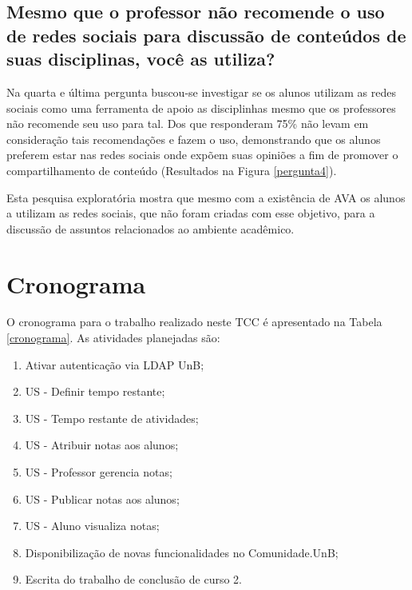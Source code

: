 \subsection*{Mesmo que o professor não recomende o uso de redes sociais para discussão de conteúdos de suas disciplinas, você as utiliza?}

Na quarta e última pergunta buscou-se investigar se os alunos utilizam as redes sociais como uma ferramenta de apoio as disciplinhas mesmo que os professores não recomende seu uso para tal. Dos que responderam 75\% não levam em consideração tais recomendações e fazem o uso, demonstrando que os alunos preferem estar nas redes sociais onde expõem suas opiniões a fim de promover o compartilhamento de conteúdo (Resultados na Figura \ref{pergunta4}).

Esta pesquisa exploratória mostra que mesmo com a existência de AVA os alunos a utilizam as redes sociais, que não foram criadas com esse objetivo, para a discussão de assuntos relacionados ao ambiente acadêmico.

\section{Cronograma}

O cronograma para o trabalho realizado neste TCC é apresentado na Tabela \ref{cronograma}. As atividades planejadas são:

\begin{enumerate}
\item Ativar autenticação via LDAP UnB;
\item US - Definir tempo restante;
\item US - Tempo restante de atividades;
\item US - Atribuir notas aos alunos;
\item US - Professor gerencia notas;
\item US - Publicar notas aos alunos;
\item US - Aluno visualiza notas;
\item Disponibilização de novas funcionalidades no Comunidade.UnB;
\item Escrita do trabalho de conclusão de curso 2.
\end{enumerate}


